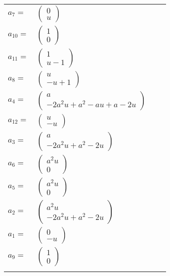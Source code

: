 \documentclass[1p]{elsarticle_modified}
\theoremstyle{definition}
\begin{document}
\begin{tabular}{m{7pt} m{180pt} m{7pt} m{180pt} }
\flushright $a_{7}=$&$\begin{pmatrix}0\\u\end{pmatrix}$ \\
\flushright $a_{10}=$&$\begin{pmatrix}1\\0\end{pmatrix}$ \\
\flushright $a_{11}=$&$\begin{pmatrix}1\\u-1\end{pmatrix}$ \\
\flushright $a_{8}=$&$\begin{pmatrix}u\\- u+1\end{pmatrix}$ \\
\flushright $a_{4}=$&$\begin{pmatrix}a\\-2 a^2 u+a^2- a u+a-2 u\end{pmatrix}$ \\
\flushright $a_{12}=$&$\begin{pmatrix}u\\- u\end{pmatrix}$ \\
\flushright $a_{3}=$&$\begin{pmatrix}a\\-2 a^2 u+a^2-2 u\end{pmatrix}$ \\
\flushright $a_{6}=$&$\begin{pmatrix}a^2 u\\0\end{pmatrix}$ \\
\flushright $a_{5}=$&$\begin{pmatrix}a^2 u\\0\end{pmatrix}$ \\
\flushright $a_{2}=$&$\begin{pmatrix}a^2 u\\-2 a^2 u+a^2-2 u\end{pmatrix}$ \\
\flushright $a_{1}=$&$\begin{pmatrix}0\\- u\end{pmatrix}$ \\
\flushright $a_{9}=$&$\begin{pmatrix}1\\0\end{pmatrix}$\\&\end{tabular}
\end{document}

